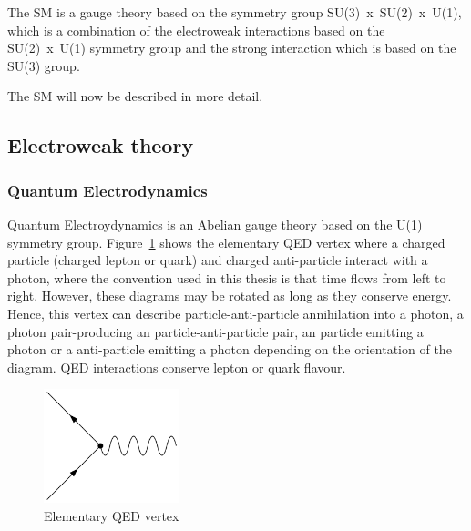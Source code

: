 The SM is a gauge theory based on the symmetry group SU(3)~x~SU(2)~x~U(1), which is a combination of the electroweak interactions based on the SU(2)~x~U(1) symmetry group and the strong interaction which is based on the SU(3) group.

The SM will now be described in more detail.

\subsection{Electroweak theory}

\subsubsection{Quantum Electrodynamics}
\label{subsec:QED}

Quantum Electroydynamics is an Abelian gauge theory based on the U(1) symmetry group. Figure~\ref{fig:QEDvertex} shows the elementary QED vertex where a charged particle (charged lepton or quark) and charged anti-particle interact with a photon, where the convention used in this thesis is that time flows from left to right. However, these diagrams may be rotated as long as they conserve energy. Hence, this vertex can describe particle-anti-particle annihilation into a photon, a photon pair-producing an particle-anti-particle pair, an particle emitting a photon or a anti-particle emitting a photon depending on the orientation of the diagram. QED interactions conserve lepton or quark flavour.


\begin{figure}[ht!]
\begin{center}
    \includegraphics[width=0.35\textwidth]{images/Theory/QEDvertex.png}
    \caption{Elementary QED vertex}
    \label{fig:QEDvertex}
\end{center}
\end{figure}

